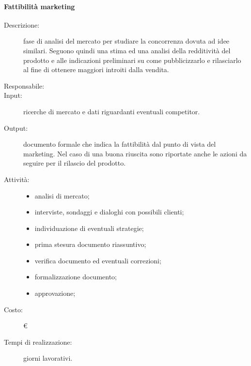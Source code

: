 \paragraph{Fattibilità marketing}
\begin{description}
\item[Descrizione:] fase di analisi del mercato per studiare la concorrenza dovuta ad idee similari. Seguono quindi una stima ed una analisi della redditività del prodotto e alle indicazioni preliminari su come pubblicizzarlo e rilasciarlo al fine di ottenere maggiori introiti dalla vendita.
\item[Responsabile:] 
\item[Input:] ricerche di mercato e dati riguardanti eventuali competitor.
\item[Output:] documento formale che indica la fattibilità dal punto di vista del marketing. Nel caso di una buona riuscita sono riportate anche le azioni da seguire per il rilascio del prodotto.
\item[Attività:]
\begin{itemize}
\item analisi di mercato;
\item interviste, sondaggi e dialoghi con possibili clienti;
\item individuazione di eventuali strategie;
\item prima stesura documento riassuntivo;
\item verifica documento ed eventuali correzioni;
\item formalizzazione documento;
\item approvazione;
\end{itemize}
\item[Costo:] \euro{}
\item[Tempi di realizzazione:]  giorni lavorativi.
\end{description}

